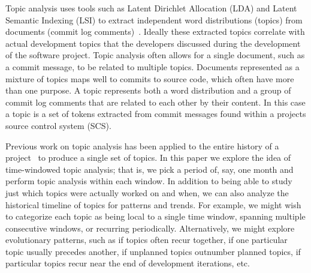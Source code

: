 \documentclass[times, 10pt,twocolumn]{article}
\begin{document}



Topic analysis 
uses tools such as Latent Dirichlet Allocation (LDA) and Latent Semantic Indexing (LSI) to extract
independent word distributions (topics) from
documents (commit log comments)~\cite{1374321-short,10.1109/ICPC.2007.13-short,lukins2008-short,10.1109/MSR.2007.20-short}.
Ideally these extracted topics 
correlate with actual development topics that the developers discussed
during the development of the software project. 
Topic analysis often allows for a single document, such as a commit
message, to be related to multiple topics. Documents represented as a mixture of topics maps well to commits
to source code, which often have more than one purpose.  A topic
represents both a word distribution and a group of commit log comments
that are related to each other by their content.  In this case a topic
is a set of tokens extracted from commit messages found within a
projects source control system (SCS). 


Previous work on topic analysis has been applied to the entire history of a 
project~\cite{1321709-short,lukins2008-short,10.1109/ICPC.2007.13-short}
to produce a single set of topics. In this paper we explore the idea
of time-windowed topic analysis; that is, we pick a period of, say,
one month and perform topic analysis within each window.  In addition
to being able to study just which topics were actually worked on and
when, we can also analyze the historical timeline of topics for
patterns and trends.  For example, we might wish to categorize each
topic as being local to a single time window, spanning multiple
consecutive windows, or recurring periodically.  Alternatively, we
might explore evolutionary patterns, such as if topics often recur together, if one particular
topic usually precedes another, if unplanned topics outnumber planned
topics, if particular topics recur near the end of development
iterations, etc. %
\end{document}

